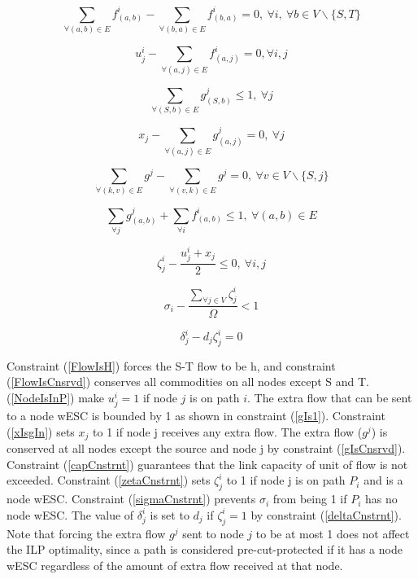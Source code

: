 \documentclass[conference]{IEEEtran}
\newcommand{\refeq}[1]{(\ref{#1})}
\begin{document}
\begin{equation}
\label{FlowIsCnsrvd}
\sum_{\forall(a,b) \in E}f^i_{(a,b)} - \sum_{\forall(b,a) \in E} f^i_{(b,a)} = 0, ~\forall i,~\forall b \in V \backslash \{S,T\}
\end{equation}

\begin{equation}
\label{NodeIsInP}
u^i_j - \sum_{\forall(a,j) \in E}f^i_{(a,j)} = 0 , \forall i, j
\end{equation}

\begin{equation}
\label{gIs1}
\sum_{\forall(S,b) \in E} g^j_{(S,b)} \leq 1,~\forall j
\end{equation}

\begin{equation}
\label{xIsgIn}
x_j - \sum_{\forall(a,j) \in E} g^j_{(a,j)} = 0,~\forall j
\end{equation}

\begin{equation}
\label{gIsCnsrvd}
\sum_{\forall(k,v) \in E}g^j - \sum_{\forall(v,k) \in E} g^j = 0, ~\forall v \in V \backslash \{S,j\}
\end{equation}

\begin{equation}
\label{capCnstrnt}
\sum_{\forall j}g^j_{(a,b)} + \sum_{\forall i} f^i_{(a,b)} \leq 1, ~\forall (a,b) \in E
\end{equation}

\begin{equation}
\label{zetaCnstrnt}
\zeta^i_j - \frac{u^i_j + x_j}{2} \leq 0, ~\forall i, j
\end{equation}

\begin{equation}
\label{sigmaCnstrnt}
\sigma_i - \frac{\sum_{\forall j \in V} \zeta^i_j}{\Omega} < 1
\end{equation}

\begin{equation}
\label{deltaCnstrnt}
\delta^i_j - d_j\zeta^i_j = 0
\end{equation}


Constraint \refeq{FlowIsH} forces the S-T flow to be h, and constraint \refeq{FlowIsCnsrvd} conserves all commodities on all nodes except S and T. \refeq{NodeIsInP} make $u^i_j = 1$ if node $j$ is on path $i$. The extra flow that can be sent to a node wESC is bounded by 1 as shown in constraint \refeq{gIs1}. Constraint \refeq{xIsgIn} sets $x_j$ to 1 if node j receives any extra flow. The extra flow ($g^j$) is conserved at all nodes except the source and node j by constraint \refeq{gIsCnsrvd}. Constraint \refeq{capCnstrnt} guarantees that the link capacity of unit of flow is not exceeded. Constraint \refeq{zetaCnstrnt} sets $\zeta^i_j$ to 1 if node j is on path $P_i$ and is a node wESC. Constraint  \refeq{sigmaCnstrnt} prevents $\sigma_i$ from being 1 if $P_i$ has no node wESC. The value of $\delta^i_j$ is set to $d_j$ if $\zeta^i_j = 1$ by constraint \refeq{deltaCnstrnt}. Note that forcing the extra flow $g^j$ sent to node $j$ to be at most 1 does not affect the ILP optimality, since a path is considered pre-cut-protected if it has a node wESC regardless of the amount of extra flow received at that node.
\end{document}

